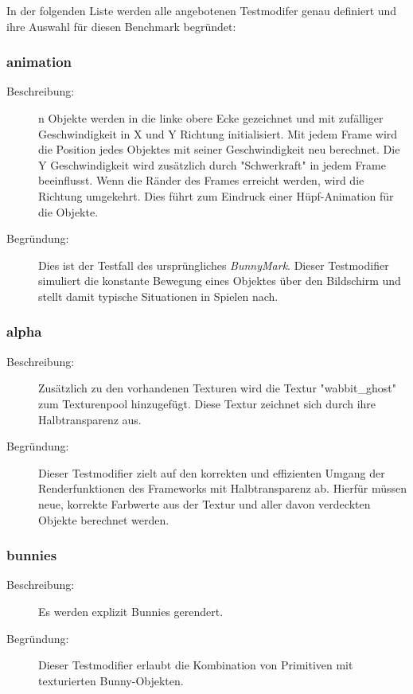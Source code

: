 In der folgenden Liste werden alle angebotenen Testmodifer genau definiert und ihre Auswahl für diesen Benchmark begründet:

\subsubsection{animation}
\begin{description}
\item[Beschreibung:] n Objekte werden in die linke obere Ecke gezeichnet und mit zufälliger Geschwindigkeit in X und Y Richtung initialisiert. Mit jedem Frame wird die Position jedes Objektes mit seiner Geschwindigkeit neu berechnet. Die Y Geschwindigkeit wird zusätzlich durch "Schwerkraft" in jedem Frame beeinflusst. Wenn die Ränder des Frames erreicht werden, wird die Richtung umgekehrt. Dies führt zum Eindruck einer Hüpf-Animation für die Objekte. \\
\item[Begründung:] Dies ist der Testfall des ursprüngliches \textit{BunnyMark}. Dieser Testmodifier simuliert die konstante Bewegung eines Objektes über den Bildschirm und stellt damit typische Situationen in Spielen nach.
\end{description}


\subsubsection{alpha}
\begin{description}
\item[Beschreibung:] Zusätzlich zu den vorhandenen Texturen wird die Textur "wabbit\_ghost" zum Texturenpool hinzugefügt. Diese Textur zeichnet sich durch ihre Halbtransparenz aus. \\                                      
\item[Begründung:] Dieser Testmodifier zielt auf den korrekten und effizienten Umgang der Renderfunktionen des Frameworks mit Halbtransparenz ab. Hierfür müssen neue, korrekte Farbwerte aus der Textur und aller davon verdeckten Objekte berechnet werden.
\end{description} 

\subsubsection{bunnies}
\begin{description}
\item[Beschreibung:] Es werden explizit Bunnies gerendert. \\
\item[Begründung:] Dieser Testmodifier erlaubt die Kombination von Primitiven mit texturierten Bunny-Objekten. 
\end{description} 

